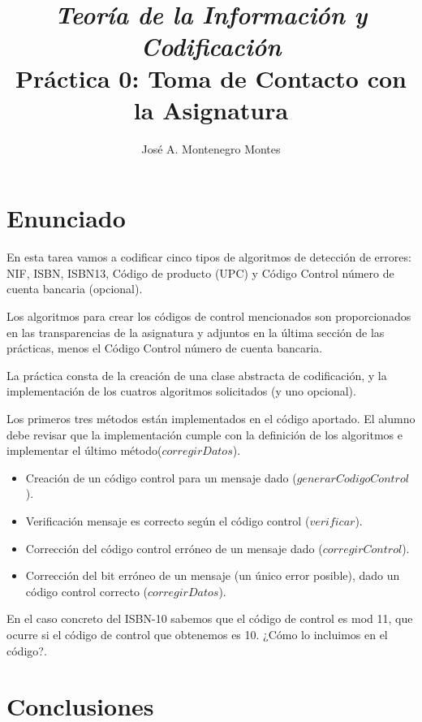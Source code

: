 \documentclass{article}
\begin{document}
\title{\textit{Teoría de la Información y Codificación}\\ \textbf{Práctica 0: Toma de Contacto con la Asignatura}}
\author{José A. Montenegro Montes}

\maketitle




\section{Enunciado}


En esta tarea vamos a codificar cinco tipos de algoritmos de detección de errores: NIF, ISBN, ISBN13, Código de producto (UPC) y Código Control número de cuenta bancaria (opcional). 

Los algoritmos para crear los códigos de control mencionados son proporcionados en las transparencias de la asignatura y adjuntos en la última sección de las prácticas, menos el Código Control número de cuenta bancaria.

La práctica consta de la creación de una clase abstracta de codificación, y la implementación de los cuatros algoritmos solicitados (y uno opcional).

Los primeros tres métodos están implementados en el código aportado. El alumno debe revisar que la implementación cumple con la definición de los algoritmos e implementar el último método($corregirDatos$).


\begin{itemize}
\item Creación de un código control para un mensaje dado ($generarCodigoControl$). 
\item Verificación mensaje es correcto según el código control ($verificar$).
\item Corrección del código control erróneo de un mensaje dado ($corregirControl$).
\item Corrección del bit erróneo de un mensaje (un único error posible), dado un código control correcto ($corregirDatos$).
\end{itemize}

En el caso concreto del ISBN-10 sabemos que el código de control es mod 11, que ocurre si el código de control que obtenemos es 10. ¿Cómo lo incluimos en el código?.


\section{Conclusiones}
\end{document}
